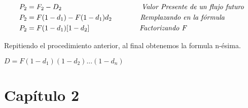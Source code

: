 \begin{spacing}{1.5}
\begin{center}
\begin{align*}
   P_{2} & = F_{2}-D_{2}\hspace{113 pt} \textit{Valor Presente de un flujo futuro}        \\
   P_{2} & = F(1-d_{1})-F(1-d_{1})d_{2} \hspace{40 pt} \textit{Remplazando en la fórmula} \\
   P_{2} & = F(1-d_{1})[1-d_{2}]\hspace{71 pt}\textit{Factorizando F}                     \\
  \end{align*}
 \end{center}
 Repitiendo el procedimiento anterior, al final obtenemos la formula n-ésima.
 \begin{center}
  $D=F(1-d_{1} )(1-d_{2} )...(1-d_{n})$
 \end{center}
\end{spacing}
\clearpage
\section{Capítulo 2}

